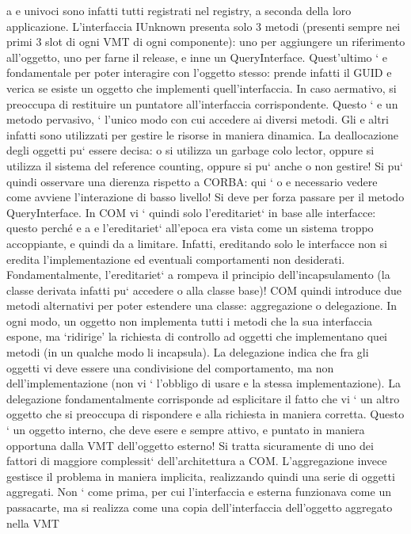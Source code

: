 \documentclass[a4paper,12pt]{article}
\begin{document}
a
e
univoci sono infatti tutti registrati nel registry, a seconda della loro applicazione.
L'interfaccia IUnknown presenta solo 3 metodi (presenti sempre nei primi
3 slot di ogni VMT di ogni componente): uno per aggiungere un riferimento
all'oggetto, uno per farne il release, e inne un QueryInterface. Quest'ultimo `
e
fondamentale per poter interagire con l'oggetto stesso: prende infatti il GUID e
verica se esiste un oggetto che implementi quell'interfaccia. In caso aermativo,
si preoccupa di restituire un puntatore all'interfaccia corrispondente. Questo `
e
un metodo pervasivo, ` l'unico modo con cui accedere ai diversi metodi. Gli
e
altri infatti sono utilizzati per gestire le risorse in maniera dinamica.
La deallocazione degli oggetti pu` essere decisa: o si utilizza un garbage colo
lector, oppure si utilizza il sistema del reference counting, oppure si pu` anche
o
non gestire! Si pu` quindi osservare una dierenza rispetto a CORBA: qui `
o
e
necessario vedere come avviene l'interazione di basso livello! Si deve per forza
passare per il metodo QueryInterface.
In COM vi ` quindi solo l'ereditariet` in base alle interfacce: questo perché
e
a
e
l'ereditariet` all'epoca era vista come un sistema troppo accoppiante, e quindi da
a
limitare. Infatti, ereditando solo le interfacce non si eredita l'implementazione
ed eventuali comportamenti non desiderati. Fondamentalmente, l'ereditariet`
a
rompeva il principio dell'incapsulamento (la classe derivata infatti pu` accedere
o
alla classe base)!
COM quindi introduce due metodi alternativi per poter estendere una classe:
aggregazione o delegazione. In ogni modo, un oggetto non implementa tutti i
metodi che la sua interfaccia espone, ma {`}ridirige' la richiesta di controllo ad
oggetti che implementano quei metodi (in un qualche modo li incapsula).
La delegazione indica che fra gli oggetti vi deve essere una condivisione
del comportamento, ma non dell'implementazione (non vi ` l'obbligo di usare
e
la stessa implementazione). La delegazione fondamentalmente corrisponde ad
esplicitare il fatto che vi ` un altro oggetto che si preoccupa di rispondere
e
alla richiesta in maniera corretta. Questo ` un oggetto interno, che deve esere
e
sempre attivo, e puntato in maniera opportuna dalla VMT dell'oggetto esterno!
Si tratta sicuramente di uno dei fattori di maggiore complessit` dell'architettura
a
COM.
L'aggregazione invece gestisce il problema in maniera implicita, realizzando
quindi una serie di oggetti aggregati. Non ` come prima, per cui l'interfaccia
e
esterna funzionava come un passacarte, ma si realizza come una copia dell'interfaccia dell'oggetto aggregato nella VMT
\end{document}
